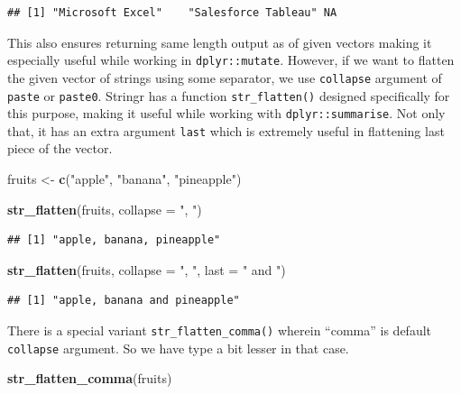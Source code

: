 \documentclass[
]{book}
\newenvironment{Shaded}{\begin{snugshade}}{\end{snugshade}}
\newcommand{\AttributeTok}[1]{\textcolor[rgb]{0.13,0.29,0.53}{#1}}
\newcommand{\FunctionTok}[1]{\textcolor[rgb]{0.13,0.29,0.53}{\textbf{#1}}}
\newcommand{\NormalTok}[1]{#1}
\newcommand{\OtherTok}[1]{\textcolor[rgb]{0.56,0.35,0.01}{#1}}
\newcommand{\StringTok}[1]{\textcolor[rgb]{0.31,0.60,0.02}{#1}}
\begin{document}
\begin{verbatim}
## [1] "Microsoft Excel"    "Salesforce Tableau" NA
\end{verbatim}

This also ensures returning same length output as of given vectors making it especially useful while working in \texttt{dplyr::mutate}. However, if we want to flatten the given vector of strings using some separator, we use \texttt{collapse} argument of \texttt{paste} or \texttt{paste0}. Stringr has a function \texttt{str\_flatten()} designed specifically for this purpose, making it useful while working with \texttt{dplyr::summarise}. Not only that, it has an extra argument \texttt{last} which is extremely useful in flattening last piece of the vector.

\begin{Shaded}
\begin{Highlighting}[]
\NormalTok{fruits }\OtherTok{\textless{}{-}} \FunctionTok{c}\NormalTok{(}\StringTok{"apple"}\NormalTok{, }\StringTok{"banana"}\NormalTok{, }\StringTok{"pineapple"}\NormalTok{)}

\FunctionTok{str\_flatten}\NormalTok{(fruits, }\AttributeTok{collapse =} \StringTok{", "}\NormalTok{)}
\end{Highlighting}
\end{Shaded}

\begin{verbatim}
## [1] "apple, banana, pineapple"
\end{verbatim}

\begin{Shaded}
\begin{Highlighting}[]
\FunctionTok{str\_flatten}\NormalTok{(fruits, }\AttributeTok{collapse =} \StringTok{", "}\NormalTok{, }\AttributeTok{last =} \StringTok{" and "}\NormalTok{)}
\end{Highlighting}
\end{Shaded}

\begin{verbatim}
## [1] "apple, banana and pineapple"
\end{verbatim}

There is a special variant \texttt{str\_flatten\_comma()} wherein ``comma'' is default \texttt{collapse} argument. So we have type a bit lesser in that case.

\begin{Shaded}
\begin{Highlighting}[]
\FunctionTok{str\_flatten\_comma}\NormalTok{(fruits)}
\end{Highlighting}
\end{Shaded}
\end{document}
